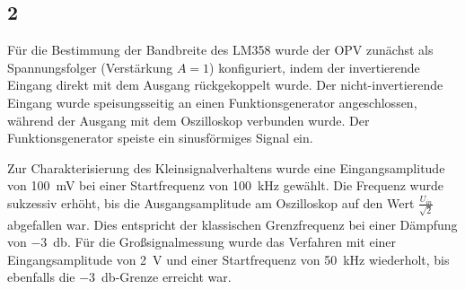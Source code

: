 \subsection*{2}
Für die Bestimmung der Bandbreite des LM358 wurde der OPV zunächst als Spannungsfolger (Verstärkung $A = 1$) konfiguriert, indem der invertierende Eingang direkt mit dem Ausgang rückgekoppelt wurde. Der nicht-invertierende Eingang wurde speisungsseitig an einen Funktionsgenerator angeschlossen, während der Ausgang mit dem Oszilloskop verbunden wurde. Der Funktionsgenerator speiste ein sinusförmiges Signal ein.

Zur Charakterisierung des Kleinsignalverhaltens wurde eine Eingangsamplitude von \qty{100}{\milli\volt} bei einer Startfrequenz von \qty{100}{\kilo\hertz} gewählt. Die Frequenz wurde sukzessiv erhöht, bis die Ausgangsamplitude am Oszilloskop auf den Wert $\frac{U_{in}}{\sqrt{2}}$ abgefallen war. Dies entspricht der klassischen Grenzfrequenz bei einer Dämpfung von \qty{-3}{\decibel}.
Für die Großsignalmessung wurde das Verfahren mit einer Eingangsamplitude von \qty{2}{\volt} und einer Startfrequenz von \qty{50}{\kilo\hertz} wiederholt, bis ebenfalls die \qty{-3}{\decibel}-Grenze erreicht war.

